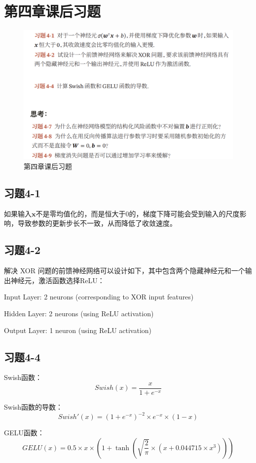 \documentclass[]{article}
\begin{document}
\section{第四章课后习题}
\begin{figure}[H]
	\centering
	\includegraphics[width=1\linewidth]{第四章课后习题}
	\caption{第四章课后习题}
	\label{fig:}
\end{figure}

\subsection{习题4-1}
如果输入$\boldsymbol{x}$不是零均值化的，而是恒大于0的，梯度下降可能会受到输入的尺度影响，导致参数的更新步长不一致，从而降低了收敛速度。

\subsection{习题4-2}
解决 XOR 问题的前馈神经网络可以设计如下，其中包含两个隐藏神经元和一个输出神经元，激活函数选择ReLU：

Input Layer: 2 neurons (corresponding to XOR input features)

Hidden Layer: 2 neurons (using ReLU activation)

Output Layer: 1 neuron (using ReLU activation)
\subsection{习题4-4}

Swish函数：
$$Swish(x) = \frac{x}{1 + e^{-x}}$$

Swish函数的导数：
$$Swish'(x) = (1 + e^{-x})^{-2} \times e^{-x} \times (1 - x)$$

GELU函数：
$$GELU(x) = 0.5 \times x \times (1 + \tanh(\sqrt{\frac{2}{\pi}} \times (x + 0.044715 \times x^3)))$$
\end{document}
